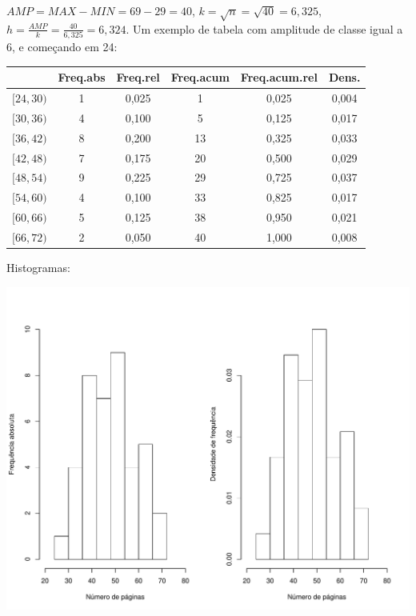 \documentclass[a4paper,11pt,fleqn]{article}\usepackage[]{graphicx}\usepackage[]{color}
\newenvironment{knitrout}{}{} %
\theoremstyle{definition}
\begin{document}
\begin{compactenum}[7.]

\item $AMP = MAX - MIN = 69-29 = 40$, $k = \sqrt{n} = \sqrt{40} =
  6,325$, $h = \frac{AMP}{k} = \frac{40}{6,325} = 6,324$. Um exemplo de
  tabela com amplitude de classe igual a 6, e começando em 24:
\begin{table}[ht]
\centering
\begin{tabular}{cccccc}
  \hline
 & Freq.abs & Freq.rel & Freq.acum & Freq.acum.rel & Dens. \\ 
  \hline
$[24,30)$ &    1 & 0,025 &    1 & 0,025 & 0,004 \\ 
  $[30,36)$ &    4 & 0,100 &    5 & 0,125 & 0,017 \\ 
  $[36,42)$ &    8 & 0,200 &   13 & 0,325 & 0,033 \\ 
  $[42,48)$ &    7 & 0,175 &   20 & 0,500 & 0,029 \\ 
  $[48,54)$ &    9 & 0,225 &   29 & 0,725 & 0,037 \\ 
  $[54,60)$ &    4 & 0,100 &   33 & 0,825 & 0,017 \\ 
  $[60,66)$ &    5 & 0,125 &   38 & 0,950 & 0,021 \\ 
  $[66,72)$ &    2 & 0,050 &   40 & 1,000 & 0,008 \\ 
   \hline
\end{tabular}
\end{table}

Histogramas:
\begin{knitrout}\small
{}\color{fgcolor}

{\centering \includegraphics[width=.8\textwidth]{figure/unnamed-chunk-5-1} 

}
\end{knitrout}
\end{compactenum}
\end{document}
